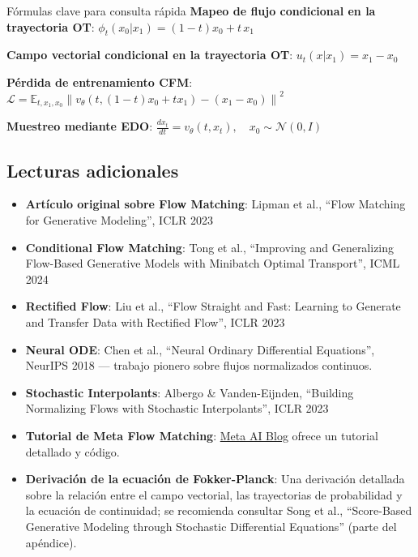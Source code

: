 \documentclass[a4paper]{article}
\begin{document}
\begin{importantbox}{Fórmulas clave para consulta rápida}
\textbf{Mapeo de flujo condicional en la trayectoria OT}: $\phi_t(x_0 | x_1) = (1 - t)x_0 + t \, x_1$

\textbf{Campo vectorial condicional en la trayectoria OT}: $u_t(x | x_1) = x_1 - x_0$

\textbf{Pérdida de entrenamiento CFM}: $\mathcal{L} = \mathbb{E}_{t, x_1, x_0} \left\| v_\theta(t, (1-t)x_0 + tx_1) - (x_1 - x_0) \right\|^2$

\textbf{Muestreo mediante EDO}: $\frac{dx_t}{dt} = v_\theta(t, x_t), \quad x_0 \sim \mathcal{N}(0, I)$
\end{importantbox}

\subsection{Lecturas adicionales}

\begin{itemize}
    \item \textbf{Artículo original sobre Flow Matching}: Lipman et al., ``Flow Matching for Generative Modeling'', ICLR 2023
    \item \textbf{Conditional Flow Matching}: Tong et al., ``Improving and Generalizing Flow-Based Generative Models with Minibatch Optimal Transport'', ICML 2024
    \item \textbf{Rectified Flow}: Liu et al., ``Flow Straight and Fast: Learning to Generate and Transfer Data with Rectified Flow'', ICLR 2023
    \item \textbf{Neural ODE}: Chen et al., ``Neural Ordinary Differential Equations'', NeurIPS 2018 — trabajo pionero sobre flujos normalizados continuos.
    \item \textbf{Stochastic Interpolants}: Albergo \& Vanden-Eijnden, ``Building Normalizing Flows with Stochastic Interpolants'', ICLR 2023
    \item \textbf{Tutorial de Meta Flow Matching}: \href{https://ai.meta.com/blog/flow-matching-guide-generative-ai/}{Meta AI Blog} ofrece un tutorial detallado y código.
    \item \textbf{Derivación de la ecuación de Fokker-Planck}: Una derivación detallada sobre la relación entre el campo vectorial, las trayectorias de probabilidad y la ecuación de continuidad; se recomienda consultar Song et al., ``Score-Based Generative Modeling through Stochastic Differential Equations'' (parte del apéndice).
\end{itemize}

\end{document}
